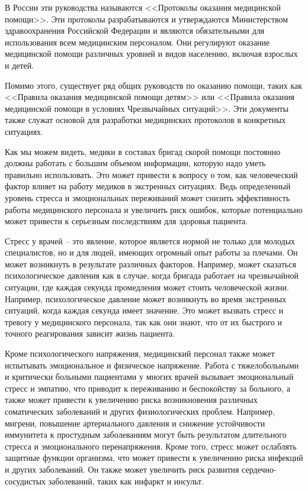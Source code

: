 В России эти руководства называются <<Протоколы оказания медицинской помощи>>. Эти протоколы разрабатываются и утверждаются Министерством здравоохранения Российской Федерации и являются обязательными для использования всем медицинским персоналом. Они  регулируют оказание медицинской помощи различных уровней и видов населению, включая взрослых и детей.

Помимо этого, существует ряд общих руководств по оказанию помощи, таких как <<Правила оказания медицинской помощи детям>> или <<Правила оказания медицинской помощи в условиях Чрезвычайных ситуаций>>. Эти документы также служат основой для разработки медицинских протоколов в конкретных ситуациях.

Как мы можем видеть, медики в составах бригад скорой помощи постоянно должны работать с большим объемом информации, которую надо уметь правильно использовать. Это может привести к вопросу о том, как человеческий фактор влияет на работу медиков в экстренных ситуациях. Ведь определенный уровень стресса и эмоциональных переживаний может снизить эффективность работы медицинского персонала и увеличить риск ошибок, которые потенциально может привести к серьезным последствиям для здоровья пациента.

Стресс у врачей – это явление, которое является нормой не только для молодых специалистов, но и для людей, имеющих огромный опыт работы за плечами. Он может возникнуть в результате различных факторов. Например, может сказаться психологическое давления как в случае, когда бригада работает на чрезвычайной ситуации, где каждая секунда промедления может стоить человеческой жизни. Например, психологическое давление может возникнуть во время экстренных ситуаций, когда каждая секунда имеет значение. Это может вызвать стресс и тревогу у медицинского персонала, так как они знают, что от их быстрого и точного реагирования зависит жизнь пациента.

Кроме психологического напряжения, медицинский персонал также может испытывать эмоциональное и физическое напряжение. Работа с тяжелобольными и критически больными пациентами у многих врачей вызывает эмоциональный стресс и эмпатию, что приводит к переживанию и беспокойству за больного, а также может привести к увеличению риска возникновения различных соматических заболеваний и других физиологических проблем. Например, мигрени, повышение артериального давления и снижение устойчивости иммунитета к простудным заболеваниям могут быть результатом длительного стресса и эмоционального перенапряжения. Кроме того, стресс может ослаблять защитные функции организма, что может привести к увеличению риска инфекций и других заболеваний. Он также может увеличить риск развития сердечно-сосудистых заболеваний, таких как инфаркт и инсульт.

